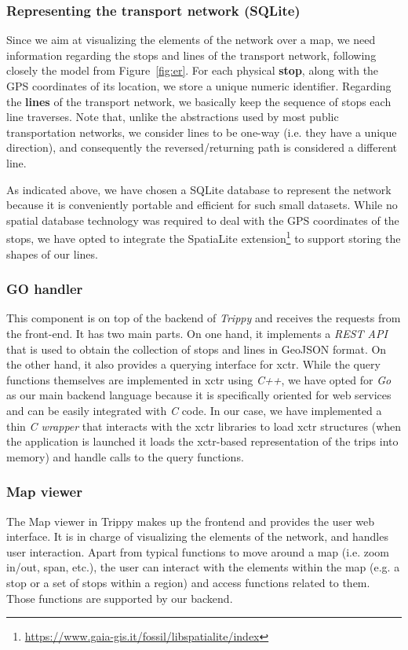     \subsubsection{\bf Representing the transport network (SQLite)}
    Since we aim at visualizing the elements of the network over a map, we need information regarding the stops and lines of the transport network, following closely the model from Figure~\ref{fig:er}. For each physical \textbf{stop}, along with the GPS coordinates of its location, we store a unique numeric identifier. Regarding the \textbf{lines} of the transport network, we basically keep the sequence of stops each line traverses. Note that, unlike the abstractions used by most public transportation networks, we consider lines to be one-way (i.e. they have a unique direction), and consequently the reversed/returning path is considered a different line.
    
    \medskip
    As indicated above, we have chosen  a SQLite database to represent the network because it is conveniently portable and efficient for such small datasets. While no spatial database technology was required to deal with the GPS coordinates of the  stops, we have opted to integrate the  SpatiaLite extension\footnote{\url{https://www.gaia-gis.it/fossil/libspatialite/index}} to support storing the shapes of our lines.
    
    \subsubsection{\bf GO handler}
    This component is on top of the backend of {\em Trippy} and receives the requests from the \mbox{front-end}. It has two main parts. On one hand, it implements a {\em REST API} that is used to obtain the collection of stops and lines in GeoJSON format. On the other hand, it also provides a querying interface for \gls{xctr}. While the query functions themselves are implemented in \gls{xctr} using {\em C++}, we have opted for {\em Go} as our main backend language because it is specifically oriented for web services and can be easily integrated with {\em C} code. In our case, we have implemented a thin {\em C wrapper} that interacts with the \gls{xctr} libraries to load \gls{xctr} structures (when the application is launched it loads the \gls{xctr}-based representation of the trips into memory) and handle calls to the query functions.
    
    \subsubsection{\bf Map viewer}
    The Map viewer in Trippy makes up the frontend and provides the user web interface. It is in charge of visualizing the elements of the network, and handles user interaction. Apart from typical functions to move around a map (i.e. zoom in/out, span, etc.), the user can interact with the elements within the map (e.g. a stop or a set of stops within a region) and access functions related to them. Those functions are supported by our backend.
    
